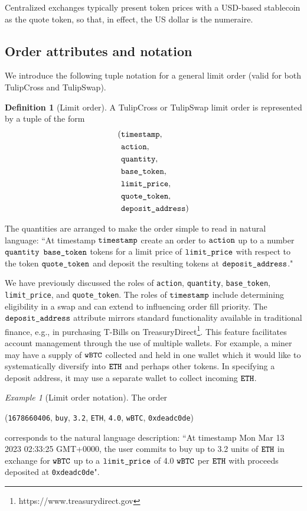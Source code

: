 \documentclass[11pt, reqno]{amsart}
\theoremstyle{definition}
\newtheorem{defn}{Definition}[subsection]
\theoremstyle{remark}
\newtheorem{exmp}{Example}[subsection]
\newcommand{\BTC}{\textnormal{\texttt{wBTC}}}
\newcommand{\ETH}{\textnormal{\texttt{ETH}}}
\newcommand{\timestamp}{\textnormal{\texttt{timestamp}}}
\newcommand{\action}{\textnormal{\texttt{action}}}
\newcommand{\quantity}{\textnormal{\texttt{quantity}}}
\newcommand{\basetoken}{\textnormal{\texttt{base\_token}}}
\newcommand{\limitprice}{\textnormal{\texttt{limit\_price}}}
\newcommand{\quotetoken}{\textnormal{\texttt{quote\_token}}}
\newcommand{\depositaddress}{\textnormal{\texttt{deposit\_address}}}
\newcommand{\buy}{\textnormal{\texttt{buy}}}
\begin{document}
Centralized exchanges typically present token prices with a USD-based stablecoin
as the quote token, so that, in effect, the US dollar is the numeraire.

\subsection{Order attributes and notation}
We introduce the following tuple notation for a general limit order
(valid for both TulipCross and TulipSwap).
\begin{defn}[Limit order]
A TulipCross or TulipSwap limit order is represented by a tuple of the form
\begin{align*}
( & \timestamp,       \\
  & \action,          \\
  & \quantity,        \\
  & \basetoken,       \\
  & \limitprice,      \\
  & \quotetoken,      \\
  & \depositaddress )
\end{align*}
\end{defn}

The quantities are arranged to make the order simple to read in natural
language:
``At timestamp $\timestamp$ create an order to $\action$ up to a number
$\quantity$ $\basetoken$ tokens for a limit price of $\limitprice$ with respect
to the token $\quotetoken$ and deposit the resulting tokens at
$\depositaddress$."

We have previously discussed the roles of \action, \quantity, \basetoken,
\limitprice, and \quotetoken.
The roles of $\timestamp$ include determining eligibility in a swap and can
extend to influencing order fill priority.
The $\depositaddress$ attribute mirrors standard functionality
available in traditional finance, e.g., in purchasing T-Bills on
TreasuryDirect\footnote{https://www.treasurydirect.gov}. This feature
facilitates account management through the use of multiple wallets. For
example, a miner may have a supply of $\BTC$ collected and held in one wallet
which it would like to systematically diversify into $\ETH$ and perhaps other
tokens. In specifying a deposit address, it may use a separate wallet to collect
incoming $\ETH$.

\begin{exmp}[Limit order notation]
The order
\begin{center}
(\textnormal{\texttt{1678660406}},
\buy,
\textnormal{\texttt{3.2}},
\ETH,
\textnormal{\texttt{4.0}},
\BTC,
\textnormal{\texttt{0xdeadc0de}})
\end{center}
corresponds to the natural language description:
``At timestamp Mon Mar 13 2023 02:33:25 GMT+0000, the user commits to buy up to
3.2 units of $\ETH$ in exchange for $\BTC$ up to a $\limitprice$ of 4.0
$\BTC$ per $\ETH$ with proceeds deposited at \textnormal{\texttt{0xdeadc0de}}".
\end{exmp}
\end{document}

